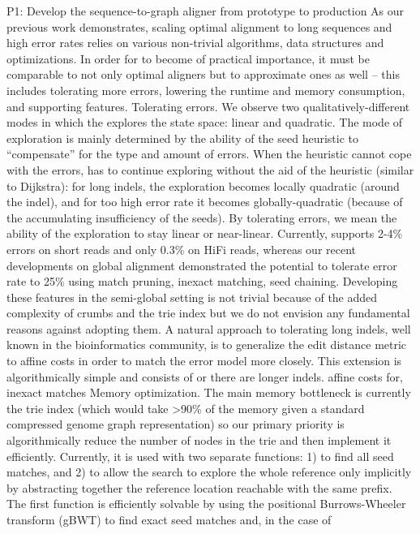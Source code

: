 P1: Develop the \astarix sequence-to-graph aligner from prototype to production As
our previous work demonstrates, scaling optimal \A alignment to long sequences
and high error rates relies on various non-trivial algorithms, data structures
and optimizations. In order for \astarix to become of practical importance, it
must be comparable to not only optimal aligners but to approximate ones as well –
this includes tolerating more errors, lowering the runtime and memory
consumption, and supporting features. Tolerating errors. We observe two
qualitatively-different modes in which the \A explores the state space: linear
and quadratic. The mode of exploration is mainly determined by the ability of
the seed heuristic to “compensate” for the type and amount of errors. When the
heuristic cannot cope with the errors, \A has to continue exploring without the
aid of the heuristic (similar to Dijkstra): for long indels, the exploration
becomes locally quadratic (around the indel), and for too high error rate it
becomes globally-quadratic (because of the accumulating insufficiency of the
seeds). By tolerating errors, we mean the ability of the exploration to stay
linear or near-linear. Currently, \astarix supports 2-4\% errors on short reads
and only 0.3\% on HiFi reads, whereas our recent developments on global
alignment demonstrated the potential to tolerate error rate to 25\% using match
pruning, inexact matching, seed chaining. Developing these features in the
semi-global setting is not trivial because of the added complexity of crumbs and
the trie index but we do not envision any fundamental reasons against adopting
them. A natural approach to tolerating long indels, well known in the
bioinformatics community, is to generalize the edit distance metric to affine
costs in order to match the error model more closely. This extension is
algorithmically simple and consists of or there are longer indels. affine costs
for, inexact matches Memory optimization. The main memory bottleneck is
currently the trie index (which would take >90\% of the memory given a standard
compressed genome graph representation) so our primary priority is
algorithmically reduce the number of nodes in the trie and then implement it
efficiently. Currently, it is used with two separate functions: 1) to find all
seed matches, and 2) to allow the search \A to explore the whole reference only
implicitly by abstracting together the reference location reachable with the
same prefix. The first function is efficiently solvable by using the positional
Burrows-Wheeler transform (gBWT) to find exact seed matches and, in the case of
